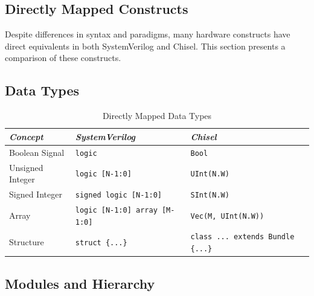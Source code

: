 \subsection{Directly Mapped Constructs}

Despite differences in syntax and paradigms, many hardware constructs have direct equivalents in both SystemVerilog and Chisel. This section presents a comparison of these constructs.

\subsection{Data Types}

\begin{table}[h!]
\centering
\begin{tabular}{|l|l|l|}
\hline
\textit{Concept} & \textit{SystemVerilog} & \textit{Chisel} \\
\hline
Boolean Signal & \texttt{logic} & \texttt{Bool} \\
Unsigned Integer & \texttt{logic [N-1:0]} & \texttt{UInt(N.W)} \\
Signed Integer & \texttt{signed logic [N-1:0]} & \texttt{SInt(N.W)} \\
Array & \texttt{logic [N-1:0] array [M-1:0]} & \texttt{Vec(M, UInt(N.W))} \\
Structure & \texttt{struct \{...\}} & \texttt{class ... extends Bundle \{...\}} \\
\hline
\end{tabular}
\caption{Directly Mapped Data Types}
\end{table}

\subsection{Modules and Hierarchy}

